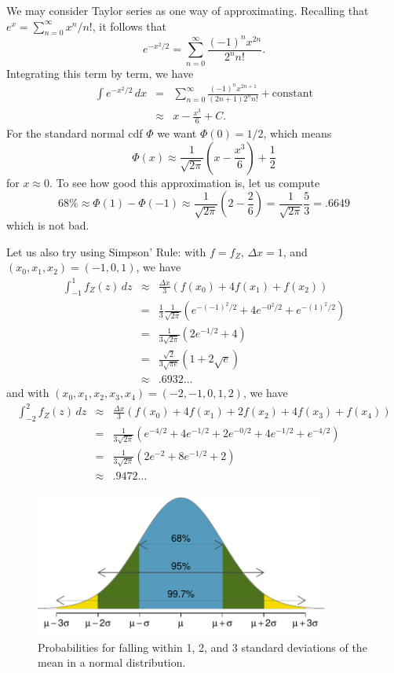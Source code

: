 We may consider Taylor series as one way of approximating. Recalling that $e^x=\sum_{n=0}^\infty x^n/n!$, it follows that
\[
	e^{-x^2/2} = \sum_{n=0}^\infty \frac{(-1)^n x^{2n}}{2^n n!}.
\]
Integrating this term by term, we have
\begin{eqnarray*}
	\int e^{-x^2/2}\,dx &=& \sum_{n=0}^\infty \frac{(-1)^n x^{2n+1}}{(2n+1)2^n n!} + \text{constant} \\
	&\approx& x -\frac{x^3}{6} +C.
\end{eqnarray*}
For the standard normal cdf $\Phi$ we want $\Phi(0)=1/2$, which means
\[
	\Phi(x)\approx \frac1{\sqrt{2\pi}} \left(x-\frac{x^3}6\right)+\frac12
\]
for $x\approx 0$.
To see how good this approximation is, let us compute
\[
	68\% \approx \Phi(1)-\Phi(-1)\approx \frac1{\sqrt{2\pi}}\left(2-\frac26\right)=\frac1{\sqrt{2\pi}}\frac53 = .6649
\]
which is not bad.

Let us also try using Simpson' Rule: with $f=f_Z$, $\Delta x = 1$, and $(x_0,x_1,x_2)=(-1,0,1)$, we have
\begin{eqnarray*}
	\int_{-1}^1 f_Z(z)\,dz &\approx& \frac{\Delta x}3 \left(f(x_0)+4f(x_1)+f(x_2)\right)\\
	&=&\frac13\frac1{\sqrt{2\pi}} (e^{-(-1)^2/2} + 4e^{-0^2/2} + e^{-(1)^2/2})\\
	&=& \frac1{3\sqrt{2\pi}} (2e^{-1/2}+4)\\
	&=& \frac{\sqrt{2}}{3\sqrt{\pi e}}(1+2\sqrt{e})\\
	&\approx& .6932\dots
\end{eqnarray*}
and with $(x_0,x_1,x_2,x_3,x_4)=(-2,-1,0,1,2)$, we have
\begin{eqnarray*}
	\int_{-2}^2 f_Z(z)\,dz &\approx& \frac{\Delta x}3 \left(f(x_0)+4f(x_1)+2f(x_2)+4f(x_3)+f(x_4)\right)\\
	&=& \frac1{3\sqrt{2\pi}} \left(e^{-4/2} + 4 e^{-1/2} + 2 e^{-0/2} + 4 e^{-1/2} + e^{-4/2}\right)\\
	&=&\frac1{3\sqrt{2\pi}}\left(2e^{-2} + 8e^{-1/2} + 2\right)\\
	&\approx& .9472\dots
\end{eqnarray*}

\begin{figure}%
\centering
\includegraphics[height=1.9in]{ch_distributions/figures/6895997/6895997}
\caption{Probabilities for falling within 1, 2, and 3 standard deviations of the mean in a normal distribution.}
\label{6895997}
\end{figure}


